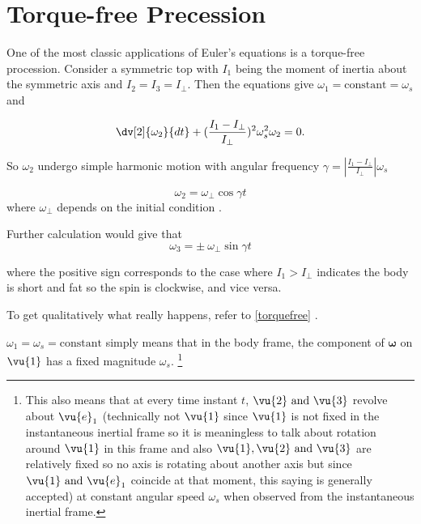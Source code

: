 \documentclass[a4paper,12pt]{report}
\begin{document}
\section{Torque-free Precession}

One of the most classic applications of Euler's equations is a torque-free procession. Consider a symmetric top with \(I_1\) being the moment of inertia about the symmetric axis and \(I_2 = I_3 = I_{\perp } \). Then the equations give \(\omega _{1} = \text{constant} = \omega _{s}  \) and 

\begin{equation}
	\dv[2]{\omega _{2} }{dt} + (\frac{I_1-I_{\perp } }{I_{\perp } } )^2 \omega _{s} ^2 \omega _{2} = 0 .
\end{equation}

So \(\omega _{2} \) undergo simple harmonic motion with angular frequency \(\gamma = \left| \frac{I_1-I_{\perp } }{I_{\perp } }  \right| \omega _{s}  \) 

\begin{equation}
	\omega _{2} = \omega _{\perp } \cos \gamma t
\end{equation}
where \(\omega _{\perp }  \) depends on the initial condition .

Further calculation would give that 
\begin{equation}
	\omega _{3} = \pm ~ \omega _{\perp } \sin \gamma t
\end{equation}

where the positive sign corresponds to the case where \(I_1 > I_{\perp } \) indicates the body is short and fat so the spin is clockwise, and vice versa.

To get qualitatively what really happens, refer to \cref{torquefree} . 

\(\omega _{1} = \omega _{s} = \text{constant}  \) simply means that in the body frame, the component of  \(\boldsymbol{\omega } \) on \(\vu{1} \) has a fixed magnitude \(\omega _{s} \). \footnote{This also means that at every time instant \(t\), \(\vu{2} \text{ and } \vu{3} \) revolve about \(\vu{e} _{1}  \) (technically not \(\vu{1} \) since \(\vu{1} \) is not fixed in the instantaneous inertial frame so it is meaningless to talk about rotation around \(\vu{1} \) in this frame and also \(\vu{1}, \vu{2} \text{ and } \vu{3} \) are relatively fixed so no axis is rotating about another axis but since \(\vu{1} \text{ and } \vu{e} _{1} \) coincide at that moment, this saying is generally accepted) at constant angular speed \(\omega _{s} \) when observed from the instantaneous inertial frame.}    
\end{document}
